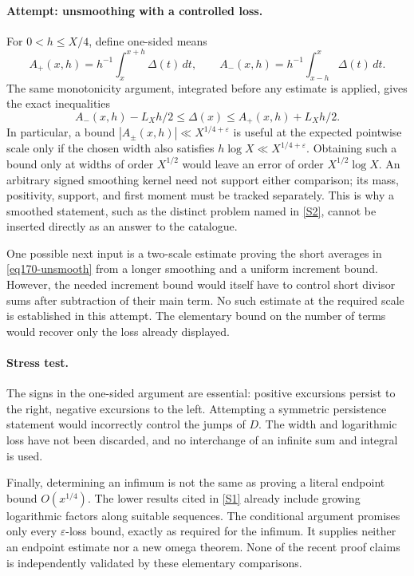 \documentclass[11pt,a4paper]{article}
\newcommand{\eps}{\varepsilon}
\newcommand{\sref}[2]{\hyperlink{source:#1:#2}{[S#2]}}
\numberwithin{equation}{section}
\begin{document}
\paragraph{Attempt: unsmoothing with a controlled loss.}
For $0<h\le X/4$, define one-sided means
\[
 A_+(x,h)=h^{-1}\int_x^{x+h}\Delta(t)\,dt,\qquad
 A_-(x,h)=h^{-1}\int_{x-h}^{x}\Delta(t)\,dt.
\]
The same monotonicity argument, integrated before any estimate is applied,
gives the exact inequalities
\begin{equation}\label{eq170-unsmooth}
 A_-(x,h)-L_Xh/2\le\Delta(x)
                    \le A_+(x,h)+L_Xh/2.
\end{equation}
In particular, a bound $|A_\pm(x,h)|\ll X^{1/4+\eps}$ is useful at the
expected pointwise scale only if the chosen width also satisfies
$h\log X\ll X^{1/4+\eps}$. Obtaining such a bound only at widths of
order $X^{1/2}$ would leave an error of order $X^{1/2}\log X$.
An arbitrary signed smoothing kernel need not support either comparison;
its mass, positivity, support, and first moment must be tracked separately.
This is why a smoothed statement, such as the distinct problem named in
\sref{statement}{2}, cannot be inserted directly as an answer to the catalogue.

One possible next input is a two-scale estimate proving the short averages
in \eqref{eq170-unsmooth} from a longer smoothing and a uniform increment
bound. However, the needed increment bound would itself have to control
short divisor sums after subtraction of their main term. No such estimate
at the required scale is established in this attempt. The elementary bound
on the number of terms would recover only the loss already displayed.

\paragraph{Stress test.}
The signs in the one-sided argument are essential: positive excursions
persist to the right, negative excursions to the left. Attempting a
symmetric persistence statement would incorrectly control the jumps of
$D$. The width and logarithmic loss have not been discarded, and no
interchange of an infinite sum and integral is used.

Finally, determining an infimum is not the same as proving a literal
endpoint bound $O(x^{1/4})$. The lower results cited in \sref{statement}{1}
already include growing logarithmic factors along suitable sequences. The
conditional argument promises only every $\eps$-loss bound, exactly as
required for the infimum. It supplies neither an endpoint estimate nor a
new omega theorem. None of the recent proof claims is independently
validated by these elementary comparisons.
\end{document}
